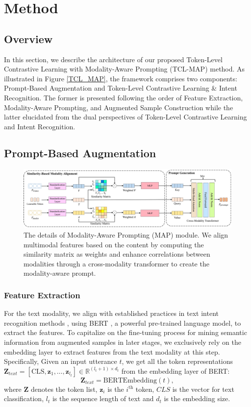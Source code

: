 \documentclass[letterpaper]{article}
\begin{document}
\section{Method}
\subsection{Overview}
In this section, we describe the architecture of our proposed Token-Level Contrastive Learning with Modality-Aware Prompting (TCL-MAP) method. As illustrated in Figure \ref{TCL_MAP}, the framework comprises two components: Prompt-Based Augmentation and Token-Level Contrastive Learning \& Intent Recognition. The former is presented following the order of Feature Extraction, Modality-Aware Prompting, and Augmented Sample Construction while the latter elucidated from the dual perspectives of Token-Level Contrastive Learning and Intent Recognition.

\subsection{Prompt-Based Augmentation}
\begin{figure}[t!]
\centering
\includegraphics[scale=.21]{Figs/MAP.pdf}
\caption{\protect \label{MAP} The details of Modality-Aware Prompting (MAP) module. We align multimodal features based on the content by computing the similarity matrix as weights and enhance correlations between modalities through a cross-modality transformer to create the modality-aware prompt.
}
\end{figure}
\subsubsection{Feature Extraction}
For the text modality, we align with established practices in text intent recognition methods \cite{10349963, 10097558}, using BERT \cite{devlin2018bert}, a powerful pre-trained language model, to extract the features. To capitalize on the fine-tuning process for mining semantic information from augmented samples in later stages, we exclusively rely on the embedding layer to extract features from the text modality at this step. Specifically, Given an input utterance $t$, we get all the token representations $\textbf{Z}_{text} = [\text{CLS}, \textbf{z}_{1}, \dots, \textbf{z}_{l_{t}}] \in \mathbb{R}^{(l_{t}+1) \times d_{t}}$ from the embedding layer of BERT:
\begin{equation}
\textbf{Z}_{text} = \text{BERTEmbedding}(t),
\end{equation}
where $\textbf{Z}$ denotes the token list, $\textbf{z}_{i}$ is the $i^{\text{th}}$ token, $CLS$ is the vector for text classification, $l_{t}$ is the sequence length of text and $d_{t}$ is the embedding size.
\end{document}
